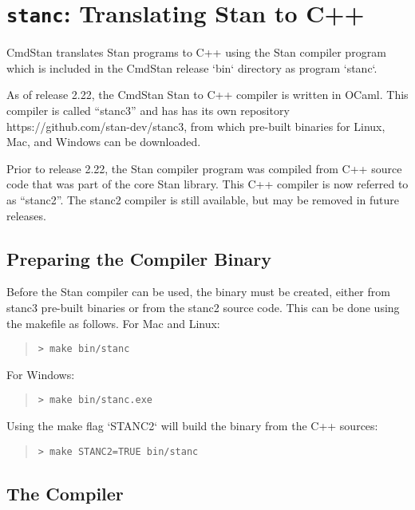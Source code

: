 \chapter{{\tt\bfseries stanc}: Translating Stan to C++}\label{stanc.chapter}


CmdStan  translates Stan programs to C++ using the Stan compiler program which
is included in the CmdStan release `bin` directory as program `stanc`.

As of release 2.22, the CmdStan Stan to C++ compiler is 
written in OCaml.
This compiler is called ``stanc3'' and has has its own repository
https://github.com/stan-dev/stanc3, from which pre-built binaries
for Linux, Mac, and Windows can be downloaded.

Prior to release 2.22, the Stan compiler program was compiled from C++ source code
that was part of the core Stan library.
This C++ compiler is now referred to as ``stanc2''.
The stanc2 compiler is still available, but may be removed in future releases.
\section{Preparing the \stanc Compiler Binary}

Before the Stan compiler can be used, the binary \stanc must be created, either from
stanc3 pre-built binaries or from the stanc2 source code.
This can be done using the makefile as follows. For Mac and Linux:
%
\begin{quote}
\begin{Verbatim}[fontshape=sl]
> make bin/stanc
\end{Verbatim}
\end{quote}
%
For Windows:
%
\begin{quote}
\begin{Verbatim}[fontshape=sl]
> make bin/stanc.exe
\end{Verbatim}
\end{quote}
%

Using the make flag `STANC2` will build the \stanc binary from the C++ sources:
%
\begin{quote}
\begin{Verbatim}[fontshape=sl]
> make STANC2=TRUE bin/stanc
\end{Verbatim}
\end{quote}
%

\section{The \stanc Compiler}

